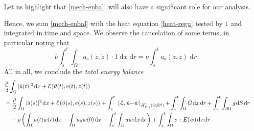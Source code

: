 \documentclass[a4paper,10pt,reqno]{amsart}
\numberwithin{equation}{section}
\newcommand{\R}{\mathbb{R}}
\numberwithin{equation}{section}
\def\dd{\;\!\mathrm{d}} %
\newcommand{\pairing}[4]{ \sideset{_{ #1 }}{_{ #2 }}  {\mathop{\langle #3 , #4
\rangle}}}
\newcommand{\teta}{\vartheta}
\newcommand{\sig}[1]{E(#1)}
\newcommand{\Dir}{\mathrm{Dir}}
\newcommand{\ass}{a_{\mathrm{s}}}
\begin{document}
Let us highlight that \eqref{mech-enbal}  will also have a significant role for our analysis. 
\par
Hence, we sum \eqref{mech-enbal} with the heat  equation \eqref{heat-regu} tested by $1$ and integrated in time and space. We observe the cancelation of some terms, in particular
noting that 
\[
\bar\nu\int_s^t \int_\Omega \ass (\dot{z},\dot{z}) \cdot 1 \dd x \dd r = \nu \int_s^t \ass (\dot{z},\dot{z})  \dd r\,.
\]
All in all, we conclude
   the \emph{total energy balance} 
\begin{equation}
\label{total-enbal}
\begin{aligned}
& 
\frac{\rho}2 \int_\Omega |\dot{u}(t)|^2 \dd x +\mathcal{E}(\teta(t), e(t), z(t)) 
\\
&  = \frac{\rho}2 \int_\Omega |\dot{u}(s)|^2 \dd x +\mathcal{E}(\teta(s), e(s),z(s))  + \int_s^t \pairing{}{H_\Dir^1 (\Omega;\R^d)}{\mathcal{L}}{\dot u{-} \dot w} 
  +\int_s^t \int_\Omega G \dd x \dd r + \int_s^t \int_{\partial\Omega} g \dd S \dd r
\\
& \quad   +\rho \left( \int_\Omega \dot{u}(t) \dot{w}(t) \dd x -  \int_\Omega \dot{u}_0 \dot{w}(0) \dd x - \int_s^t \int_\Omega \dot{u}\ddot w \dd x \dd r \right)     + 
\int_s^t \int_\Omega \sigma: \sig{\dot w} \dd x \dd r
 \,.\end{aligned}
\end{equation}
\end{document}
